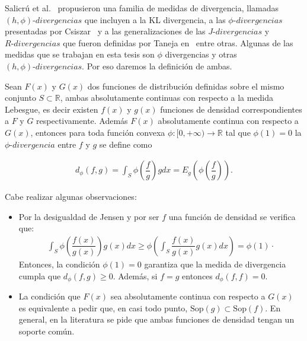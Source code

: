 Salicrú et al.~\cite{Salicru1994} propusieron una familia de medidas de divergencia, llamadas $(h,\phi) \text{-} divergencias$ que incluyen a la KL divergencia, a las $\phi \text{-} divergencias$ presentadas por Csiszar~\cite{Csiszar1967} y a las generalizaciones de las $J \text{-} divergencias$ y $R \text{-} divergencias$ que fueron definidas por Taneja en~\cite{Taneja1989} entre otras. Algunas de las medidas que se trabajan en esta tesis son $\phi$ divergencias y otras  $(h,\phi) \text{-} divergencias$. Por eso daremos la definición de ambas.

\begin{definition}
	\label{fiDivergencia}
	Sean $F(x)$ y $G(x)$ dos funciones de distribución definidas sobre el mismo conjunto $S \subset \mathbb{R}$, ambas absolutamente continuas con respecto a la medida Lebesgue, es decir existen $f(x)$ y $g(x)$ funciones de densidad correspondientes a $F$ y $G$ respectivamente. Además $F(x)$ absolutamente continua con respecto a $G(x)$, entonces para toda función convexa $\phi:[0,+\infty)\longrightarrow \mathbb{R}$ tal que $\phi(1)=0$ la $\phi \text{-} divergencia$ entre $f$ y $g$ se define como
	
	\begin{align}
	d_{\phi}(f, g)=\int_{S}  \phi\left(\dfrac{f}{g}\right) g dx=E_{g}\left(\phi\left(\dfrac{f}{g}\right)\right).
	\end{align}
\end{definition}

Cabe realizar algunas observaciones:

\begin{itemize}
	\item Por la desigualdad de Jensen y por ser $f$ una función de densidad se verifica que:
	\begin{align}
	\displaystyle \int_{S} \phi\left(\dfrac{f(x)}{g(x)}\right) g(x) dx \geq \phi\left(\int_{S} \dfrac{f(x)}{g(x)} g(x) dx\right)=\phi(1)\cdot
	\end{align}
	Entonces, la condición $\phi(1)=0$ garantiza que la medida de divergencia cumpla que $d_{\phi}(f, g) \geq 0.$ Además, si $f=g$ entonces $d_{\phi}(f, f)= 0.$ 
	\item La condición que $F(x)$ sea absolutamente continua con respecto a $G(x)$ es equivalente a pedir que, en casi todo punto, $\mathrm{Sop}(g) \subset \mathrm{Sop}(f).$ En general, en la literatura se pide que ambas funciones de densidad tengan un soporte común.
\end{itemize}

